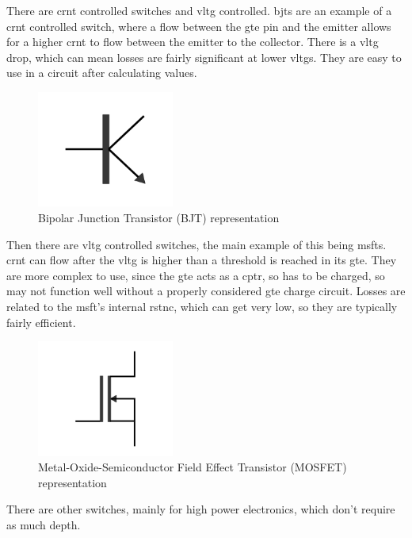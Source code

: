 \documentclass[a4paper,11pt]{report}
\begin{document}
There are \gls{crnt} controlled switches and \gls{vltg} controlled. \gls{bjt}s are an example of a \gls{crnt} controlled switch, where a flow between the \gls{gte} pin and the emitter allows for a higher \gls{crnt} to flow between the emitter to the collector. There is a \gls{vltg} drop, which can mean losses are fairly significant at lower \gls{vltg}s. They are easy to use in a circuit after calculating values.

\begin{figure}[H]
\centering
\includegraphics[width=0.4\textwidth]{BJT}
\caption{Bipolar Junction Transistor (BJT) representation}
\end{figure}

Then there are \gls{vltg} controlled switches, the main example of this being \gls{msft}s. \gls{crnt} can flow after the \gls{vltg} is higher than a threshold is reached in its \gls{gte}. They are more complex to use, since the \gls{gte} acts as a \gls{cptr}, so has to be charged, so may not function well without a properly considered \gls{gte} charge circuit. Losses are related to the \gls{msft}'s internal \gls{rstnc}, which can get very low, so they are typically fairly efficient.

\begin{figure}[H]
\centering
\includegraphics[width=0.4\textwidth]{MOSFET}
\caption{Metal-Oxide-Semiconductor Field Effect Transistor (MOSFET) representation}
\end{figure}

There are other switches, mainly for high power electronics, which don't require as much depth.
\end{document}
